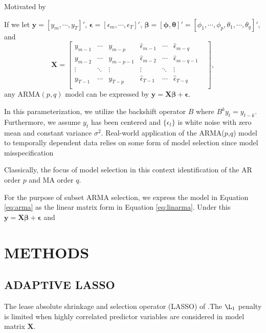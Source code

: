 Motivated by 


If we let $\bm{y}=[y_{m},\cdots,y_T]'$, $\bm{\epsilon}=[\epsilon_{m},\cdots,\epsilon_T]'$, $\bm{\beta}=[\bm{\phi},\bm{\theta}]'=[\phi_1,\cdots,\phi_p,\theta_1,\cdots,\theta_q]'$, and 
\begin{equation*}
\bm{X}=	\begin{bmatrix} y_{m-1} & \cdots & y_{m-p} &
					\hat{\epsilon}_{m-1} & \cdots & \hat{\epsilon}_{m-q} \\
					y_{m-2} & \cdots & y_{m-p-1} &
					\hat{\epsilon}_{m-2} & \cdots & \hat{\epsilon}_{m-q-1} \\
					\vdots & \ddots & \vdots &
					\vdots & \ddots & \vdots & \\
					y_{T-1} & \cdots & y_{T-p} &
					\hat{\epsilon}_{T-1} & \cdots & \hat{\epsilon}_{T-q} \\
	\end{bmatrix},
\end{equation*}
any ARMA$(p,q)$ model can be expressed by $\bm{y}=\bm{X}\bm{\beta}+\bm{\epsilon}$. 






In this parameterization, we utilize the backshift operator $B$ where $B^ky_{t}=y_{t-k}$. Furthermore, we assume $y_t$ has been centered and $\{\epsilon_t\}$ is white noise with zero mean and constant variance $\sigma^2$. Real-world application of the ARMA($p$,$q$) model to temporally dependent data relies on some form of model selection since model misspecification  

 Classically, the focus of model selection in this context identification of the AR order $p$ and MA order $q$.

For the purpose of subset ARMA selection, we express the model in Equation \ref{eq:arma} as the linear matrix form in Equation \ref{eq:linarma}. Under this $\bm{y}=\bm{X}\bm{\beta}+\bm{\epsilon}$ and







\cite{Chen2011} 


\section{METHODS}

\subsection{ADAPTIVE LASSO}
The lease absolute shrinkage and selection operator (LASSO) of \cite{Tibshirani1996}.The $\L_1$ penalty is limited when highly correlated predictor variables are considered in model matrix $\bm{X}$.

